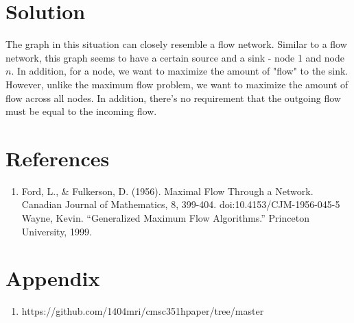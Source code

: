 \documentclass[11pt]{article}
\begin{document}
\section{Solution}
The graph in this situation can closely resemble a flow network.  
Similar to a flow network, this graph seems to have a certain source and a sink - node 1 and node $n$. In addition, for a node, we want to maximize the amount of "flow" to the sink. However, unlike the maximum flow problem, we want to maximize the amount of flow across all nodes. In addition, there's no requirement that the outgoing flow must be equal to the incoming flow.

\section{References}
\begin{enumerate}
	\item 
Ford, L., \& Fulkerson, D. (1956). Maximal Flow Through a Network. Canadian Journal of Mathematics, 8, 399-404. doi:10.4153/CJM-1956-045-5
Wayne, Kevin. “Generalized Maximum Flow Algorithms.” Princeton University, 1999. 
\end{enumerate}
\section{Appendix}
\begin{enumerate}
	\item https://github.com/1404mri/cmsc351hpaper/tree/master
\end{enumerate}
\end{document}
